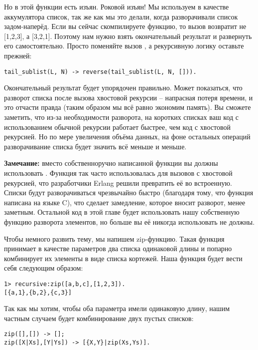 Но в этой функции есть изъян.
Роковой изъян!
Мы используем в качестве аккумулятора список, так же как мы это делали, когда разворачивали список задом\--наперёд.
Если вы сейчас скомпилируете функцию, то вызов  возвратит не [1,2,3], а [3,2,1].
Поэтому нам нужно взять окончательный результат и развернуть его самостоятельно.
Просто поменяйте вызов , а рекурсивную логику оставьте прежней:
\begin{lstlisting}[style=erlang]
tail_sublist(L, N) -> reverse(tail_sublist(L, N, [])).
\end{lstlisting}

Окончательный результат будет упорядочен правильно.
Может показаться, что разворот списка после вызова хвостовой рекурсии \--- напрасная потеря времени, и это отчасти правда (таким образом мы всё равно экономим память).
Вы сможете заметить, что из\--за необходимости разворота, на коротких списках ваш код с использованием обычной рекурсии работает быстрее, чем код с хвостовой рекурсией.
Но по мере увеличения объёма данных, на фоне остальных операций разворачивание списка будет значить всё меньше и меньше.\\
\colorbox{lgray}
{
    \begin{minipage}{\linewidth}
\textbf{Замечание:} вместо собственноручно написанной функции  вы должны использовать .
Функция так часто использовалась для вызовов с хвостовой рекурсией, что разработчики Erlang решили превратить её во встроенную.
Списки будут разворачиваться чрезвычайно быстро (благодаря тому, что функция написана на языке C), что сделает замедление, которое вносит разворот, менее заметным.
Остальной код в этой главе будет использовать нашу собственную функцию разворота элементов, но больше вы её никогда использовать не должны.
    \end{minipage}
}

Чтобы немного развить тему, мы напишем zip\--функцию.
Такая функция принимает в качестве параметров два списка одинаковой длины и попарно комбинирует их элементы в виде списка кортежей.
Наша функция  будет вести себя следующим образом:
\begin{lstlisting}[style=erlang]
1> recursive:zip([a,b,c],[1,2,3]).
[{a,1},{b,2},{c,3}]
\end{lstlisting}

Так как мы хотим, чтобы оба параметра имели одинаковую длину, нашим частным случаем будет комбинирование двух пустых списков:
\begin{lstlisting}[style=erlang]
zip([],[]) -> [];
zip([X|Xs],[Y|Ys]) -> [{X,Y}|zip(Xs,Ys)].
\end{lstlisting}

